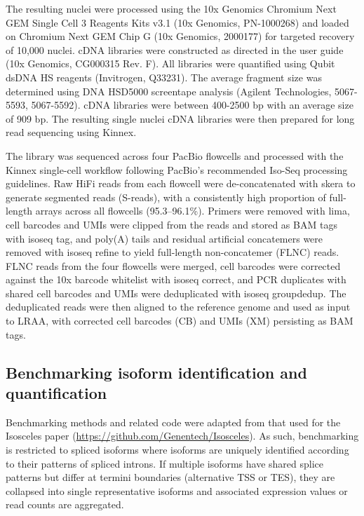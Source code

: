The resulting nuclei were processed using the 10x Genomics Chromium Next GEM Single Cell 3\p{} Reagents Kits v3.1 (10x Genomics, PN-1000268) and loaded on Chromium Next GEM Chip G (10x Genomics, 2000177) for targeted recovery of 10,000 nuclei. cDNA libraries were constructed as directed in the user guide (10x Genomics, CG000315 Rev. F). All libraries were quantified using Qubit dsDNA HS reagents (Invitrogen, Q33231). The average fragment size was determined using DNA HSD5000 screentape analysis (Agilent Technologies, 5067-5593, 5067-5592). cDNA libraries were between 400-2500 bp with an average size of 909 bp. The resulting single nuclei cDNA libraries were then prepared for long read sequencing using Kinnex.

The library was sequenced across four PacBio flowcells and processed with the Kinnex single-cell workflow following PacBio's recommended Iso-Seq processing guidelines. Raw HiFi reads from each flowcell were de-concatenated with skera to generate segmented reads (S-reads), with a consistently high proportion of full-length arrays across all flowcells (95.3--96.1\%). Primers were removed with lima, cell barcodes and UMIs were clipped from the reads and stored as BAM tags with isoseq tag, and poly(A) tails and residual artificial concatemers were removed with isoseq refine to yield full-length non-concatemer (FLNC) reads. FLNC reads from the four flowcells were merged, cell barcodes were corrected against the 10x barcode whitelist with isoseq correct, and PCR duplicates with shared cell barcodes and UMIs were deduplicated with isoseq groupdedup. The deduplicated reads were then aligned to the reference genome and used as input to LRAA, with corrected cell barcodes (CB) and UMIs (XM) persisting as BAM tags.

\subsection{Benchmarking isoform identification and quantification}\label{benchmarking-isoform-identification-and-quantification}

Benchmarking methods and related code were adapted from that used for the Isosceles paper \citep{kabza2024} (\url{https://github.com/Genentech/Isosceles}). As such, benchmarking is restricted to spliced isoforms where isoforms are uniquely identified according to their patterns of spliced introns. If multiple isoforms have shared splice patterns but differ at termini boundaries (alternative TSS or TES), they are collapsed into single representative isoforms and associated expression values or read counts are aggregated.

